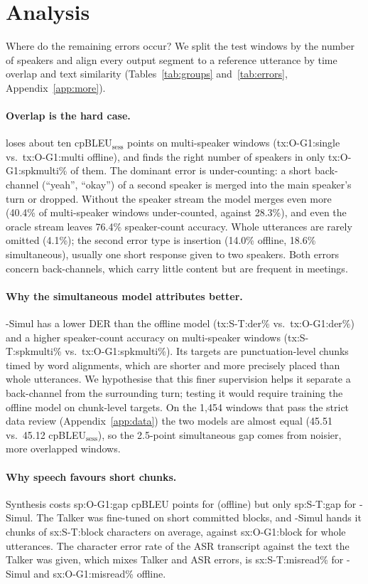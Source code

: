 \section{Analysis}
\label{sec:analysis}

Where do the remaining errors occur? We split the test windows by the number of speakers and align every output
segment to a reference utterance by time overlap and text similarity (Tables~\ref{tab:groups} and~\ref{tab:errors},
Appendix~\ref{app:more}).

\paragraph{Overlap is the hard case.} \sys{} loses about ten cpBLEU$_\text{sess}$ points on multi-speaker windows
(\num{tx:O-G1:single} vs.\ \num{tx:O-G1:multi} offline), and finds the right number of speakers in only
\num{tx:O-G1:spkmulti}\% of them. The dominant error is under-counting: a short back-channel (``yeah'', ``okay'') of a
second speaker is merged into the main speaker's turn or dropped. Without the speaker stream the model merges even more
(40.4\% of multi-speaker windows under-counted, against 28.3\%), and even the oracle stream leaves 76.4\% speaker-count
accuracy. Whole utterances are rarely omitted (4.1\%); the second error type is insertion (14.0\% offline, 18.6\%
simultaneous), usually one short response given to two speakers. Both errors concern back-channels, which carry little
content but are frequent in meetings.

\paragraph{Why the simultaneous model attributes better.} \sys{}-Simul has a lower DER than the offline model
(\num{tx:S-T:der}\% vs.\ \num{tx:O-G1:der}\%) and a higher speaker-count accuracy on multi-speaker windows
(\num{tx:S-T:spkmulti}\% vs.\ \num{tx:O-G1:spkmulti}\%). Its targets are punctuation-level chunks timed by word
alignments, which are shorter and more precisely placed than whole utterances. We hypothesise that this finer
supervision helps it separate a back-channel from the surrounding turn; testing it would require training the offline
model on chunk-level targets. On the 1{,}454 windows that pass the strict data review (Appendix~\ref{app:data}) the two
models are almost equal (45.51 vs.\ 45.12 cpBLEU$_\text{sess}$), so the 2.5-point simultaneous gap comes from noisier,
more overlapped windows.

\paragraph{Why speech favours short chunks.} Synthesis costs \num{sp:O-G1:gap} cpBLEU points for \sys{} (offline) but
only \num{sp:S-T:gap} for \sys{}-Simul. The Talker was fine-tuned on short committed blocks, and \sys{}-Simul hands it
chunks of \num{sx:S-T:block} characters on average, against \num{sx:O-G1:block} for whole utterances. The character
error rate of the ASR transcript against the text the Talker was given, which mixes Talker and ASR errors, is
\num{sx:S-T:misread}\% for \sys{}-Simul and \num{sx:O-G1:misread}\% offline.
